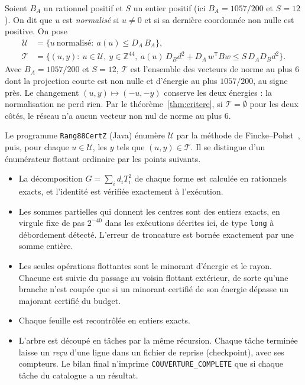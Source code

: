 \documentclass[11pt,a4paper]{amsart}
\theoremstyle{plain}
\theoremstyle{definition}
\numberwithin{equation}{section}
\newcommand{\Z}{\mathbb{Z}}
\newcommand{\Uc}{\mathcal{U}}
\newcommand{\Tc}{\mathcal{T}}
\begin{document}
Soient $B_A$ un rationnel positif et $S$ un entier positif (ici $B_A=1057/200$ et $S=12$). On dit que $u$ est \emph{normalisé} si $u\ne0$ et si sa dernière coordonnée non nulle est positive. On pose
\begin{align*}
\Uc&=\{u\ \text{normalisé}:\ a(u)\le D_A\,B_A\},\\
\Tc&=\{(u,y):\ u\in\Uc,\ y\in\Z^{44},\ a(u)\,D_Bd^2+D_A\,w^{\mathsf T}Bw\le S\,D_AD_Bd^2\}.
\end{align*}
Avec $B_A=1057/200$ et $S=12$, $\Tc$ est l'ensemble des vecteurs de norme au plus $6$ dont la projection courte est non nulle et d'énergie au plus $1057/200$, au signe près. Le changement $(u,y)\mapsto(-u,-y)$ conserve les deux énergies : la normalisation ne perd rien. Par le théorème~\ref{thm:critere}, si $\Tc=\emptyset$ pour les deux côtés, le réseau n'a aucun vecteur non nul de norme au plus $6$.

Le programme \texttt{Rang88CertZ} (Java) énumère $\Uc$ par la méthode de Fincke--Pohst~\cite{FP85}, puis, pour chaque $u\in\Uc$, les $y$ tels que $(u,y)\in\Tc$. Il se distingue d'un énumérateur flottant ordinaire par les points suivants.
\begin{itemize}
\item La décomposition $G=\sum_id_iT_i^2$ de chaque forme est calculée en rationnels exacts, et l'identité est vérifiée exactement à l'exécution.
\item Les sommes partielles qui donnent les centres sont des entiers exacts, en virgule fixe de pas $2^{-40}$ dans les exécutions décrites ici, de type \texttt{long} à débordement détecté. L'erreur de troncature est bornée exactement par une somme entière.
\item Les seules opérations flottantes sont le minorant d'énergie et le rayon. Chacune est suivie du passage au voisin flottant extérieur, de sorte qu'une branche n'est coupée que si un minorant certifié de son énergie dépasse un majorant certifié du budget.
\item Chaque feuille est recontrôlée en entiers exacts.
\item L'arbre est découpé en tâches par la même récursion. Chaque tâche terminée laisse un \emph{reçu} d'une ligne dans un fichier de reprise (checkpoint), avec ses compteurs. Le bilan final n'imprime \texttt{COUVERTURE\_COMPLETE} que si chaque tâche du catalogue a un résultat.
\end{itemize}
\end{document}
